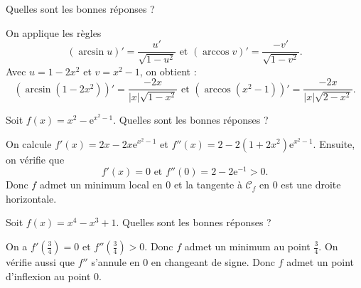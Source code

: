 \begin{question}

Quelles sont les bonnes réponses ?
\begin{answers}
\end{answers}
\begin{explanations}
On applique les règles
$$(\arcsin u)'=\frac{u'}{\sqrt{1-u^2}}\mbox{ et }(\arccos v)'=\frac{-v'}{\sqrt{1-v^2}}.$$
Avec $u=1-2x^2$ et $v=x^2-1$, on obtient :
$$(\arcsin (1-2x^2))'=\frac{-2x}{|x|\sqrt{1-x^2}}\mbox{ et }(\arccos (x^2-1))'=\frac{-2x}{|x|\sqrt{2-x^2}}.$$
\end{explanations}
\end{question}



\begin{question}

Soit $\displaystyle f(x)=x^2-\mathrm{e}^{x^2-1}$. Quelles sont les bonnes réponses ?
\begin{answers}  
\end{answers}
\begin{explanations}
On calcule $f'(x)=2x-2x\mathrm{e}^{x^2-1}$ et $f''(x)=2-2(1+2x^2)\mathrm{e}^{x^2-1}$. Ensuite, on vérifie que
$$f'(x)=0\mbox{ et }f''(0)=2-2\mathrm{e}^{-1}>0.$$
Donc $f$ admet un minimum local en $0$ et la tangente à $\mathcal{C}_f$ en $0$ est une droite horizontale.
\end{explanations}
\end{question}



\begin{question}

Soit $\displaystyle f(x)=x^4-x^3+1$. Quelles sont les bonnes réponses ?
\begin{answers}  
\end{answers}
\begin{explanations}
On a $f'\left(\frac{3}{4}\right)=0$ et $f''\left(\frac{3}{4}\right)>0$. Donc $f$ admet un minimum au point $\displaystyle \frac{3}{4}$. On vérifie aussi que $f''$ s'annule en $0$ en changeant de signe. Donc $f$ admet un point d'inflexion au point $0$.
\end{explanations}
\end{question}




